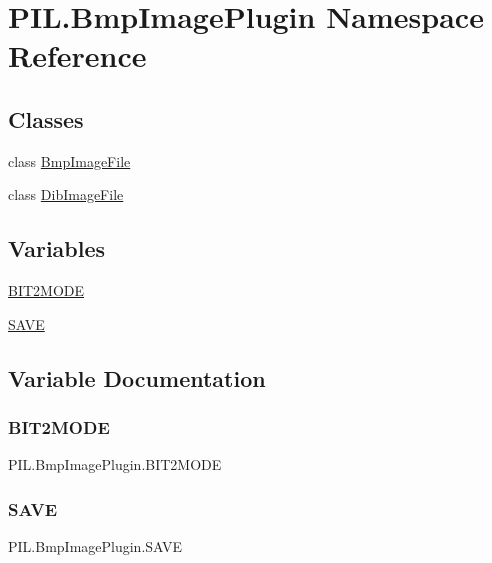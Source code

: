 \hypertarget{namespacePIL_1_1BmpImagePlugin}{}\section{P\+I\+L.\+Bmp\+Image\+Plugin Namespace Reference}
\label{namespacePIL_1_1BmpImagePlugin}
\subsection*{Classes}
\begin{DoxyCompactItemize}
\item 
class \hyperlink{classPIL_1_1BmpImagePlugin_1_1BmpImageFile}{Bmp\+Image\+File}
\item 
class \hyperlink{classPIL_1_1BmpImagePlugin_1_1DibImageFile}{Dib\+Image\+File}
\end{DoxyCompactItemize}
\subsection*{Variables}
\begin{DoxyCompactItemize}
\item 
\hyperlink{namespacePIL_1_1BmpImagePlugin_a6f76e2020dfbfc69e60019c00112056b}{B\+I\+T2\+M\+O\+DE}
\item 
\hyperlink{namespacePIL_1_1BmpImagePlugin_a6112b5e74076642266f54e8259d9e820}{S\+A\+VE}
\end{DoxyCompactItemize}


\subsection{Variable Documentation}
\mbox{\label{namespacePIL_1_1BmpImagePlugin_a6f76e2020dfbfc69e60019c00112056b}} 
\subsubsection{\texorpdfstring{B\+I\+T2\+M\+O\+DE}{BIT2MODE}}
{\footnotesize\ttfamily P\+I\+L.\+Bmp\+Image\+Plugin.\+B\+I\+T2\+M\+O\+DE}

\mbox{\label{namespacePIL_1_1BmpImagePlugin_a6112b5e74076642266f54e8259d9e820}} 
\subsubsection{\texorpdfstring{S\+A\+VE}{SAVE}}
{\footnotesize\ttfamily P\+I\+L.\+Bmp\+Image\+Plugin.\+S\+A\+VE}

